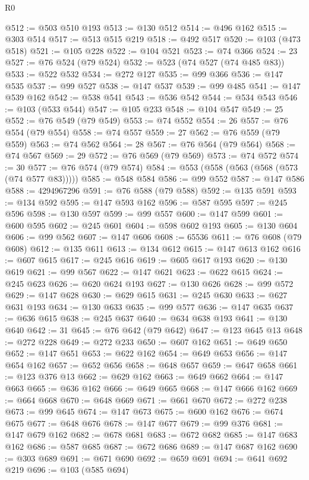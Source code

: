 \begin{lexlean}{R0}
\begin{coremodule}
@512 := @503 @510 @193
@513 := @130 @512
@514 := @496 @162
@515 := @303 @514
@517 := @513 @515 @219
@518 := @492 @517
@520 := @103 (@473 @518)
@521 := @105 @228
@522 := @104 @521
@523 := @74 @366
@524 := 23
@527 := @76 @524 (@79 @524)
@532 := @523 (@74 @527 (@74 @485 @83))
@533 := @522 @532
@534 := @272 @127
@535 := @99 @366
@536 := @147 @535
@537 := @99 @527
@538 := @147 @537
@539 := @99 @485
@541 := @147 @539 @162
@542 := @538 @541
@543 := @536 @542
@544 := @534 @543
@546 := @103 (@533 @544)
@547 := @105 @233
@548 := @104 @547
@549 := 25
@552 := @76 @549 (@79 @549)
@553 := @74 @552
@554 := 26
@557 := @76 @554 (@79 @554)
@558 := @74 @557
@559 := 27
@562 := @76 @559 (@79 @559)
@563 := @74 @562
@564 := 28
@567 := @76 @564 (@79 @564)
@568 := @74 @567
@569 := 29
@572 := @76 @569 (@79 @569)
@573 := @74 @572
@574 := 30
@577 := @76 @574 (@79 @574)
@584 := @553 (@558 (@563 (@568 (@573 (@74 @577 @83)))))
@585 := @548 @584
@586 := @99 @552
@587 := @147 @586
@588 := 4294967296
@591 := @76 @588 (@79 @588)
@592 := @135 @591
@593 := @134 @592
@595 := @147 @593 @162
@596 := @587 @595
@597 := @245 @596
@598 := @130 @597
@599 := @99 @557
@600 := @147 @599
@601 := @600 @595
@602 := @245 @601
@604 := @598 @602 @193
@605 := @130 @604
@606 := @99 @562
@607 := @147 @606
@608 := 65536
@611 := @76 @608 (@79 @608)
@612 := @135 @611
@613 := @134 @612
@615 := @147 @613 @162
@616 := @607 @615
@617 := @245 @616
@619 := @605 @617 @193
@620 := @130 @619
@621 := @99 @567
@622 := @147 @621
@623 := @622 @615
@624 := @245 @623
@626 := @620 @624 @193
@627 := @130 @626
@628 := @99 @572
@629 := @147 @628
@630 := @629 @615
@631 := @245 @630
@633 := @627 @631 @193
@634 := @130 @633
@635 := @99 @577
@636 := @147 @635
@637 := @636 @615
@638 := @245 @637
@640 := @634 @638 @193
@641 := @130 @640
@642 := 31
@645 := @76 @642 (@79 @642)
@647 := @123 @645 @13
@648 := @272 @228
@649 := @272 @233
@650 := @607 @162
@651 := @649 @650
@652 := @147 @651
@653 := @622 @162
@654 := @649 @653
@656 := @147 @654 @162
@657 := @652 @656
@658 := @648 @657
@659 := @647 @658
@661 := @123 @376 @13
@662 := @629 @162
@663 := @649 @662
@664 := @147 @663
@665 := @636 @162
@666 := @649 @665
@668 := @147 @666 @162
@669 := @664 @668
@670 := @648 @669
@671 := @661 @670
@672 := @272 @238
@673 := @99 @645
@674 := @147 @673
@675 := @600 @162
@676 := @674 @675
@677 := @648 @676
@678 := @147 @677
@679 := @99 @376
@681 := @147 @679 @162
@682 := @678 @681
@683 := @672 @682
@685 := @147 @683 @162
@686 := @587 @685
@687 := @672 @686
@689 := @147 @687 @162
@690 := @303 @689
@691 := @671 @690
@692 := @659 @691
@694 := @641 @692 @219
@696 := @103 (@585 @694)

\end{coremodule}
\end{lexlean}
